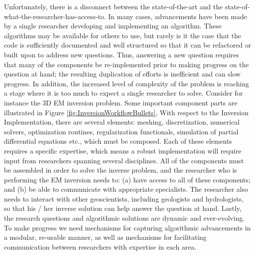 \documentclass[paper]{geophysics}
\begin{document}
Unfortunately, there is a disconnect between the state-of-the-art and the state-of-what-the-researcher-has-access-to. In many cases, advancements have been made by a single researcher developing and implementing an algorithm. These algorithms may be available for others to use, but rarely is it the case that the code is sufficiently documented and well structured so that it can be refactored or built upon to address new questions. Thus, answering a new question requires that many of the components be re-implemented prior to making progress on the question at hand; the resulting duplication of efforts is inefficient and can slow progress. In addition, the increased level of complexity of the problem is reaching a stage where it is too much to expect a single researcher to solve. Consider for instance the 3D EM inversion problem. Some important component parts are illustrated in Figure \ref{fig:InversionWorkflowBullets}, With respect to the Inversion Implementation, there are several elements: meshing, discretization, numerical solvers, optimization routines, regularization functionals, simulation of partial differential equations etc., which must be composed. Each of these elements requires a specific expertise, which means a robust implementation will require input from researchers spanning several disciplines. All of the components must be assembled in order to solve the inverse problem, and the researcher who is performing the EM inversion needs to: (a) have access to all of these components; and (b) be able to communicate with appropriate specialists. The researcher also needs to interact with other geoscientists, including geologists and hydrologists, so that his / her inverse solution can help answer the question at hand. Lastly, the research questions and algorithmic solutions are dynamic and ever-evolving. To make progress we need mechanisms for capturing algorithmic advancements in a modular, re-usable manner, as well as mechanisms for facilitating communication between researchers with expertise in each area.


\end{document}
